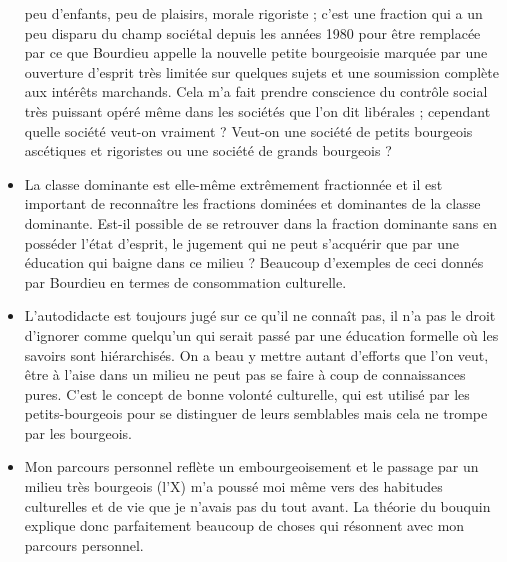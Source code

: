 \begin{itemize}
  peu d'enfants, peu de plaisirs, morale rigoriste ; c'est une fraction qui a
  un peu disparu du champ sociétal depuis les années 1980 pour être remplacée
  par ce que Bourdieu appelle la nouvelle petite bourgeoisie marquée par une
  ouverture d'esprit très limitée sur quelques sujets et une soumission complète
  aux intérêts marchands. Cela m'a fait prendre conscience du contrôle social
  très puissant opéré même dans les sociétés que l'on dit libérales ; cependant
  quelle société veut-on vraiment ? Veut-on une société de petits bourgeois ascétiques
  et rigoristes ou une société de grands bourgeois ?
  \item La classe dominante est elle-même extrêmement fractionnée et il est
  important de reconnaître les fractions dominées et dominantes de la classe
  dominante. Est-il possible de se retrouver dans la fraction dominante sans
  en posséder l'état d'esprit, le jugement qui ne peut s'acquérir que par une
  éducation qui baigne dans ce milieu ? Beaucoup d'exemples de ceci donnés par
  Bourdieu en termes de consommation culturelle.
  \item L'autodidacte est toujours jugé sur ce qu'il ne connaît pas, il n'a pas
  le droit d'ignorer comme quelqu'un qui serait passé par une éducation formelle
  où les savoirs sont hiérarchisés. On a beau y mettre autant d'efforts que
  l'on veut, être à l'aise dans un milieu ne peut pas se faire à coup de
  connaissances pures. C'est le concept de bonne volonté culturelle, qui est utilisé
  par les petits-bourgeois pour se distinguer de leurs semblables mais cela ne
  trompe par les bourgeois.
  \item Mon parcours personnel reflète un embourgeoisement et le passage par un
  milieu très bourgeois (l'X) m'a poussé moi même vers des habitudes culturelles
  et de vie que je n'avais pas du tout avant. La théorie du bouquin explique
  donc parfaitement beaucoup de choses qui résonnent avec mon parcours personnel.
\end{itemize}
